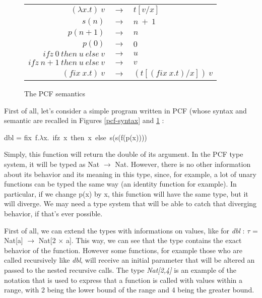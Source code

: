 \documentclass[a4paper,12pt]{article}
\begin{document}
\begin{figure}
  \begin{center}
    \begin{tabular}{r c l}
      $(\lambda x.t)~v$ & $\rightarrow$ & $t[v/x]$ \\
      $s(n)$ & $\rightarrow$ & $ n~+~1$ \\
      $p(n+1)$ & $\rightarrow$ & $ n$ \\
      $p(0)$ & $\rightarrow$ & $0$ \\
      $ifz~0~then~u~else~v$ & $\rightarrow$ & $u$ \\
      $ifz~n+1~then~u~else~v$ & $\rightarrow$ & $v$ \\
      $(fix~x.t)~v$ & $\rightarrow$ & $(t[(fix~x.t)/x])~v$
    \end{tabular}
  \end{center}
  \caption{The PCF semantics}
  \label{pcf-sem}
\end{figure}

First of all, let's consider a simple program written in PCF (whose syntax and
semantic are recalled in Figures \ref{pcf-syntax} and \ref{pcf-sem} :

\begin{center} 
  dbl = fix~f.$\lambda $x.~ifz~x~then~x~else~s(s(f(p(x)))) 
\end{center}

Simply, this function will return the double of its argument. In the PCF type
system, it will be typed as Nat $\rightarrow$ Nat. However, there is no other
information about its behavior and its meaning in this type, since, for example,
a lot of unary functions can be typed the same way (an identity function for
example). In particular, if we change p(x) by x, this function will have the
same type, but it will diverge. We may need a type system that will be able to
catch that diverging behavior, if that's ever possible.

First of all, we can extend the types with informations on values,
like for \emph{dbl} : $\tau$ = Nat[a] $\rightarrow$ Nat[2 $\times$
a]. This way, we can see that the type contains the exact behavior of
the function. However some functions, for example those who are called
recursively like \emph{dbl}, will receive an initial parameter that
will be altered an passed to the nested recursive calls. The type
\emph{Nat[2,4]} is an example of the notation that is used to
express that a function is called with values within a range, with 2
being the lower bound of the range and 4 being the greater
bound.
\end{document}
